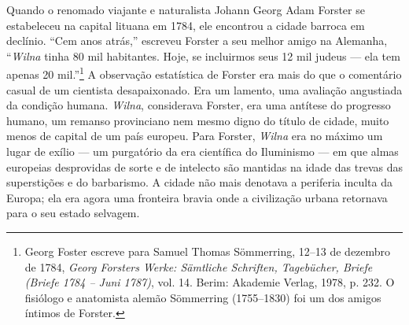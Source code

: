 Quando o renomado viajante e naturalista Johann Georg Adam Forster se
estabeleceu na capital lituana em 1784, ele encontrou a cidade barroca
em declínio. ``Cem anos atrás,'' escreveu Forster a seu melhor amigo na
Alemanha, ``\textit{Wilna} tinha 80 mil habitantes. Hoje, se incluirmos seus 12
mil judeus --- ela tem apenas 20 mil.''\footnote{Georg Foster escreve para Samuel Thomas Sömmerring, 12--13 de dezembro de 1784, \textit{Georg Forsters Werke: Sämtliche Schriften, Tagebücher, Briefe (Briefe 1784 -- Juni 1787)}, vol. 14. Berim: Akademie Verlag, 1978, p. 232. O fisiólogo e anatomista alemão Sömmerring (1755--1830) foi um dos amigos íntimos de Forster.} A observação estatística de Forster era mais do que o comentário casual de um cientista
desapaixonado. Era um lamento, uma avaliação angustiada da condição
humana. \textit{Wilna}, considerava Forster, era uma antítese do progresso
humano, um remanso provinciano nem mesmo digno do título de cidade,
muito menos de capital de um país europeu. Para Forster, \textit{Wilna} era no
máximo um lugar de exílio --- um purgatório da era científica do
Iluminismo --- em que almas europeias desprovidas de sorte e de intelecto
são mantidas na idade das trevas das superstições e do barbarismo. A
cidade não mais denotava a periferia inculta da Europa; ela era agora
uma fronteira bravia onde a civilização urbana retornava para o seu
estado selvagem.

